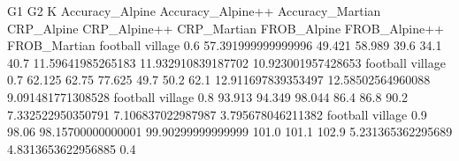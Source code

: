 G1 G2 K Accuracy_Alpine Accuracy_Alpine++ Accuracy_Martian CRP_Alpine CRP_Alpine++ CRP_Martian FROB_Alpine FROB_Alpine++ FROB_Martian
football village 0.6 57.391999999999996 49.421 58.989 39.6 34.1 40.7 11.59641985265183 11.932910839187702 10.923001957428653
football village 0.7 62.125 62.75 77.625 49.7 50.2 62.1 12.911697839353497 12.58502564960088 9.091481771308528
football village 0.8 93.913 94.349 98.044 86.4 86.8 90.2 7.332522950350791 7.106837022987987 3.795678046211382
football village 0.9 98.06 98.15700000000001 99.90299999999999 101.0 101.1 102.9 5.231365362295689 4.8313653622956885 0.4
